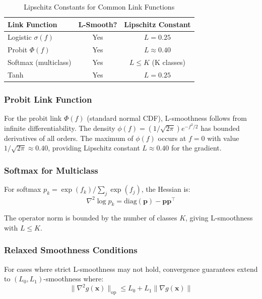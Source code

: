 \documentclass[12pt]{article}
\begin{document}
\begin{table}[H]
\centering
\caption{Lipschitz Constants for Common Link Functions}
\begin{tabular}{lcc}
\toprule
\textbf{Link Function} & \textbf{L-Smooth?} & \textbf{Lipschitz Constant} \\
\midrule
Logistic $\sigma(f)$ & Yes & $L = 0.25$ \\
Probit $\Phi(f)$ & Yes & $L \approx 0.40$ \\
Softmax (multiclass) & Yes & $L \leq K$ (K classes) \\
Tanh & Yes & $L = 0.25$ \\
\bottomrule
\end{tabular}
\end{table}

\subsubsection{Probit Link Function}

For the probit link $\Phi(f)$ (standard normal CDF), L-smoothness follows from infinite differentiability. The density $\phi(f) = (1/\sqrt{2\pi})e^{-f^2/2}$ has bounded derivatives of all orders. The maximum of $\phi(f)$ occurs at $f=0$ with value $1/\sqrt{2\pi} \approx 0.40$, providing Lipschitz constant $L \approx 0.40$ for the gradient.

\subsubsection{Softmax for Multiclass}

For softmax $p_k = \exp(f_k)/\sum_j \exp(f_j)$, the Hessian is:
\begin{equation}
\nabla^2 \log p_k = \text{diag}(\mathbf{p}) - \mathbf{p}\mathbf{p}^\top
\end{equation}

The operator norm is bounded by the number of classes $K$, giving L-smoothness with $L \leq K$.

\subsubsection{Relaxed Smoothness Conditions}

For cases where strict L-smoothness may not hold, convergence guarantees extend to $(L_0, L_1)$-smoothness where:
\begin{equation}
\|\nabla^2 g(\mathbf{x})\|_{\text{op}} \leq L_0 + L_1\|\nabla g(\mathbf{x})\|
\end{equation}
\end{document}
